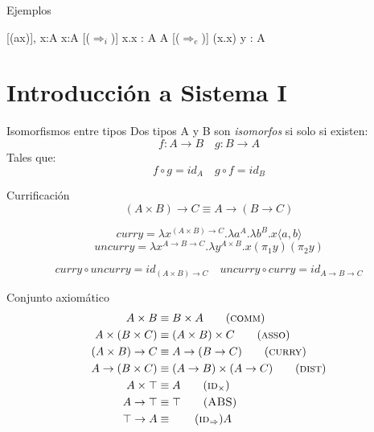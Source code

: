 \documentclass[aspectratio=149]{beamer}
\begin{document}
\begin{frame}{Ejemplos}
	\begin{prooftree}
		{\emptyset, x:A \vdash x:A}
		[($\Rightarrow_i$)]{ \emptyset \vdash \lambda x.x : A \rightarrow A }
		[($\Rightarrow_e$)]{ \emptyset \vdash (\lambda x.x) y : A }
	\end{prooftree}
\end{frame}

\section{Introducción a Sistema I}

\begin{frame}{Isomorfismos entre tipos}
	Dos tipos A y B son \textit{isomorfos} si solo si existen:
	\[ f: A \rightarrow B \quad g: B \rightarrow A \]
	Tales que:
	\[ f \circ g = id_A \quad g \circ f = id_B \]
	
	\begin{exampleblock}{Currificación}
		\[ (A \times B) \rightarrow C \equiv A \rightarrow (B \rightarrow C) \]
		
		\[ curry = \lambda x^{(A \times B) \rightarrow C}. \lambda a^A . \lambda b^B . x\langle a,b \rangle \]
		\[ uncurry = \lambda x^{A \rightarrow B \rightarrow C}. \lambda y^{A \times B} . x(\pi_1 y)(\pi_2 y) \]
		
		\[ curry \circ uncurry = id_{(A \times B) \rightarrow C} \quad
		uncurry \circ curry = id_{A \rightarrow B \rightarrow C} \]
	\end{exampleblock}
\end{frame}

\begin{frame}{Conjunto axiomático}
	\begin{align*}
		A \times B &\equiv B \times A \tag{\textsc{comm}} \\
		A \times (B \times C) &\equiv (A \times B) \times C \tag{\textsc{asso}} \\
		(A \times B) \rightarrow C &\equiv A \rightarrow (B \rightarrow C) \tag{\textsc{curry}} \\
		A \rightarrow (B \times C) &\equiv (A \rightarrow B) \times (A \rightarrow C) \tag{\textsc{dist}} \\
		A \times \top &\equiv A \tag{\textsc{id$_\times$}} \\
		A \rightarrow \top &\equiv \top \tag{\textsc{ABS}} \\
		\top \rightarrow A &\equiv \tag{\textsc{id$_\Rightarrow$}} A
	\end{align*}
\end{frame}
\end{document}
